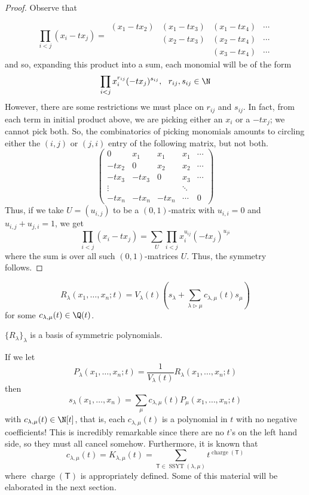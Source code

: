 \documentclass[11pt,leqno,oneside]{amsart}
\numberwithin{thm}{section}
\newcommand{\T}{\mathsf{T}} %
\newcommand{\charge}{\operatorname{charge}}
\newcommand{\SSYT}{\operatorname{SSYT}} %
\newcommand{\strictlydominates}{\mathrel{\rhd}}
\begin{document}
\begin{proof}
  Observe that \[
    \prod_{i < j}(x_i-tx_j) =
    \begin{array}{cccc}
      &&&\\
      &&&\\
      (x_1-tx_2)&(x_1-tx_3)&(x_1-tx_4)&\cdots\\
                &(x_2-tx_3)&(x_2-tx_4)&\cdots\\
                &          &(x_3-tx_4)&\cdots
    \end{array}
  \]
  and so, expanding this product into a sum, each monomial will be of
  the form \[ 
    \prod_{i < j} x_i^{r_{ij}} (-tx_j)^{s_{ij}}, \ \ r_{ij},s_{ij} \in \N
  \]
  However, there are some restrictions we must place on \(r_{ij}\) and
  \(s_{ij}\). In fact, from each term in initial product above, we are
  picking either an \(x_i\) or a \(-tx_j\); we cannot pick both. So,
  the combinatorics of picking monomials amounts to circling either
  the \((i,j)\) or \((j,i)\) entry of the following matrix, but not
  both. \[
    \left(
      \begin{array}{ccccc}
        0&x_1&x_1&x_1&\cdots\\
        -tx_2&0&x_2&x_2&\cdots\\
        -tx_3&-tx_3&0&x_3&\cdots\\
        \vdots&&&\ddots&\\
        -tx_n&-tx_n&-tx_n&\cdots&0
      \end{array}
\right)
  \]
  Thus, if we take \(U = (u_{i,j})\) to be a \((0,1)\)-matrix with
  \(u_{i,i} = 0\) and \(u_{i,j}+u_{j,i} = 1\), we get \[
    \prod_{i < j} (x_i-tx_j) = \sum_{U} \prod_{i < j} x_i^{u_{ij}}(-t
    x_j)^{u_{ji}} 
  \]
  where the sum is over all such \((0,1)\)-matrices \(U\). Thus, the
  symmetry follows. 
\end{proof}
\begin{prop}
  \[
    R_\lambda(x_1, \ldots, x_n;t) = V_{\lambda}(t) \left( s_\lambda +
      \sum_{\lambda \strictlydominates \mu} c_{\lambda,\mu}(t) s_\mu
    \right) 
  \]
  for some \(c_{\lambda,\mu}(t) \in \Q(t)\).
\end{prop}
\begin{cor}
  \(\{R_\lambda\}_{\lambda}\) is a basis of symmetric polynomials.
\end{cor}
\begin{rmk}\label{s-in-terms-of-P}
  If we let \[
    P_\lambda(x_1, \ldots, x_n; t) = \frac{1}{V_\lambda(t)}
    R_\lambda(x_1, \ldots, x_n;t)
  \]
  then \[
    s_\lambda(x_1, \ldots, x_n) = \sum_{\mu} c_{\lambda,\mu}(t)
    P_\mu(x_1, \ldots, x_n;t) 
  \]
  with \(c_{\lambda,\mu}(t) \in \N[t]\), that is, each
  \(c_{\lambda,\mu}(t)\) is a polynomial in \(t\) with no negative
  coefficients! This is incredibly remarkable since there are no
  \(t\)'s on the left hand side, so they must all cancel
  somehow. Furthermore, it is known that \[
    c_{\lambda,\mu}(t) = K_{\lambda,\mu}(t) = \sum_{\T \in
      \SSYT(\lambda,\mu)} t^{\charge(\T)}
  \]
  where \(\charge(\T)\) is appropriately defined. Some of this
  material will be elaborated in the next section.
\end{rmk}
\end{document}
